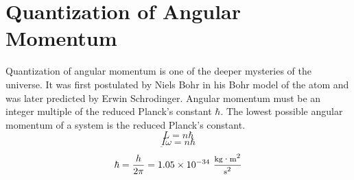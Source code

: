  \section{Quantization of Angular Momentum}
 Quantization of angular momentum is one of the deeper mysteries of the universe.  It was first postulated by Niels Bohr in his Bohr model of the atom and was later predicted by Erwin Schrodinger.  Angular momentum must be an integer multiple of the reduced Planck's constant $\hbar$.  The lowest possible angular momentum of a system is the reduced Planck's constant.
$$ L=n\hbar$$
$$ \underbar{I}\omega=n\hbar$$
$$ \hbar=\frac{h}{2\pi}=1.05\times 10^{-34}\  \footnotesize \frac{\text{kg}\cdot \text{m}^2}{\text{s}^2}$$




 